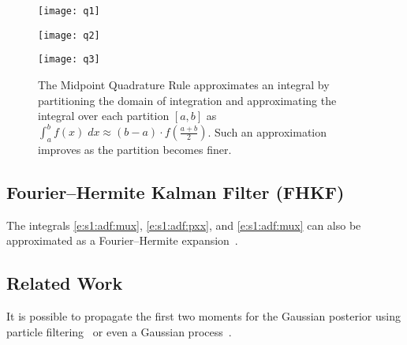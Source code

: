 \begin{figure}[h]
\begin{minipage}[c]{.32\textwidth}
\texttt{[image: q1]}
\end{minipage}
\hfill
\begin{minipage}[c]{.32\textwidth}
\texttt{[image: q2]}
\end{minipage}
\hfill
\begin{minipage}[c]{.32\textwidth}
\texttt{[image: q3]}
\end{minipage}
\caption[The Midpoint Quadrature Rule]{The Midpoint Quadrature Rule approximates an integral by partitioning the domain of integration and approximating the integral over each partition $[a,b]$ as $\int_a^b f(x)\; dx \approx (b-a)\cdot f(\tfrac{a+b}{2})$.  Such an approximation improves as the partition becomes finer.}
\end{figure}

\subsection{Fourier--Hermite Kalman Filter (FHKF)} 
The integrals \eqref{e:s1:adf:mux}, \eqref{e:s1:adf:pxx}, and \eqref{e:s1:adf:mux} can also be approximated as a Fourier--Hermite expansion~\cite{Sar12}.

\subsection{Related Work}
It is possible to propagate the first two moments for the Gaussian posterior using particle filtering~\cite{Kot03b} or even a Gaussian process~\cite{Ko07,Ko09}.

